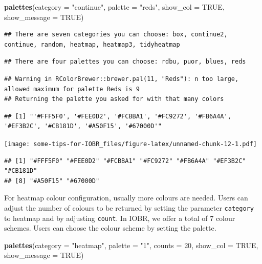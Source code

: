 \documentclass[
  12pt,
]{book}
\newenvironment{Shaded}{\begin{snugshade}}{\end{snugshade}}
\newcommand{\AttributeTok}[1]{\textcolor[rgb]{0.13,0.29,0.53}{#1}}
\newcommand{\ConstantTok}[1]{\textcolor[rgb]{0.56,0.35,0.01}{#1}}
\newcommand{\DecValTok}[1]{\textcolor[rgb]{0.00,0.00,0.81}{#1}}
\newcommand{\FunctionTok}[1]{\textcolor[rgb]{0.13,0.29,0.53}{\textbf{#1}}}
\newcommand{\NormalTok}[1]{#1}
\newcommand{\StringTok}[1]{\textcolor[rgb]{0.31,0.60,0.02}{#1}}
\begin{document}
\begin{Shaded}
\begin{Highlighting}[]
\FunctionTok{palettes}\NormalTok{(}\AttributeTok{category =} \StringTok{"continue"}\NormalTok{, }\AttributeTok{palette =} \StringTok{"reds"}\NormalTok{, }\AttributeTok{show\_col =} \ConstantTok{TRUE}\NormalTok{, }\AttributeTok{show\_message =} \ConstantTok{TRUE}\NormalTok{)}
\end{Highlighting}
\end{Shaded}

\begin{verbatim}
## There are seven categories you can choose: box, continue2, continue, random, heatmap, heatmap3, tidyheatmap
\end{verbatim}

\begin{verbatim}
## There are four palettes you can choose: rdbu, puor, blues, reds
\end{verbatim}

\begin{verbatim}
## Warning in RColorBrewer::brewer.pal(11, "Reds"): n too large, allowed maximum for palette Reds is 9
## Returning the palette you asked for with that many colors
\end{verbatim}

\begin{verbatim}
## [1] "'#FFF5F0', '#FEE0D2', '#FCBBA1', '#FC9272', '#FB6A4A', '#EF3B2C', '#CB181D', '#A50F15', '#67000D'"
\end{verbatim}

\texttt{[image: some-tips-for-IOBR\_files/figure-latex/unnamed-chunk-12-1.pdf]}

\begin{verbatim}
## [1] "#FFF5F0" "#FEE0D2" "#FCBBA1" "#FC9272" "#FB6A4A" "#EF3B2C" "#CB181D"
## [8] "#A50F15" "#67000D"
\end{verbatim}

For heatmap colour configuration, usually more colours are needed. Users can adjust the number of colours to be returned by setting the parameter \texttt{category} to heatmap and by adjusting \texttt{count}. In IOBR, we offer a total of 7 colour schemes. Users can choose the colour scheme by setting the palette.

\begin{Shaded}
\begin{Highlighting}[]
\FunctionTok{palettes}\NormalTok{(}\AttributeTok{category =} \StringTok{"heatmap"}\NormalTok{, }\AttributeTok{palette =} \StringTok{"1"}\NormalTok{, }\AttributeTok{counts =} \DecValTok{20}\NormalTok{, }\AttributeTok{show\_col =} \ConstantTok{TRUE}\NormalTok{, }\AttributeTok{show\_message =} \ConstantTok{TRUE}\NormalTok{)}
\end{Highlighting}
\end{Shaded}
\end{document}
